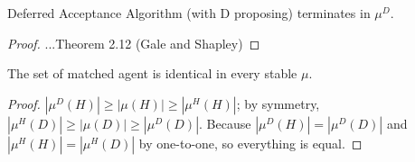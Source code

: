\documentclass[11pt]{elegantbook}
\begin{document}
\begin{theorem}
    Deferred Acceptance Algorithm (with D proposing) terminates in $\mu^D$.
\end{theorem}
\begin{proof}
    ...Theorem 2.12 (Gale and Shapley)
\end{proof}

\begin{theorem}
    The set of matched agent is identical in every stable $\mu$.
\end{theorem}
\begin{proof}
    $|\mu^D(H)|\geq |\mu(H)|\geq |\mu^H(H)|$; by symmetry, $|\mu^H(D)|\geq |\mu(D)|\geq |\mu^D(D)|$. Because $|\mu^D(H)|=|\mu^D(D)|$ and $|\mu^H(H)|=|\mu^H(D)|$ by one-to-one, so everything is equal.
\end{proof}
\end{document}
